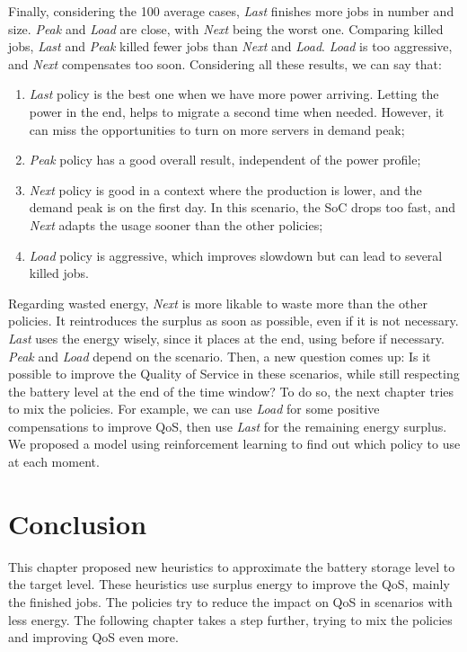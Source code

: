 Finally, considering the 100 average cases, \emph{Last} finishes more jobs in number and size. \emph{Peak} and \emph{Load} are close, with \emph{Next} being the worst one. Comparing killed jobs, \emph{Last} and \emph{Peak} killed fewer jobs than \emph{Next} and \emph{Load}. \emph{Load} is too aggressive, and \emph{Next} compensates too soon. Considering all these results, we can say that: 
\begin{enumerate}
    \item \emph{Last} policy is the best one when we have more power arriving. Letting the power in the end, helps to migrate a second time when needed. However, it can miss the opportunities to turn on more servers in demand peak;
    \item \emph{Peak} policy has a good overall result, independent of the power profile;
    \item \emph{Next} policy is good in a context where the production is lower, and the demand peak is on the first day. In this scenario, the SoC drops too fast, and \emph{Next} adapts the usage sooner than the other policies;
    \item \emph{Load} policy is aggressive, which improves slowdown but can lead to several killed jobs.
\end{enumerate}

Regarding wasted energy, \emph{Next} is more likable to waste more than the other policies. It reintroduces the surplus as soon as possible, even if it is not necessary. \emph{Last} uses the energy wisely, since it places at the end, using before if necessary. \emph{Peak} and \emph{Load} depend on the scenario. Then, a new question comes up: Is it possible to improve the Quality of Service in these scenarios, while still respecting the battery level at the end of the time window? To do so, the next chapter tries to mix the policies. For example, we can use \emph{Load} for some positive compensations to improve QoS, then use \emph{Last} for the remaining energy surplus. We proposed a model using reinforcement learning to find out which policy to use at each moment.

\section{Conclusion}
This chapter proposed new heuristics to approximate the battery storage level to the target level. These heuristics use surplus energy to improve the QoS, mainly the finished jobs. The policies try to reduce the impact on QoS in scenarios with less energy. The following chapter takes a step further, trying to mix the policies and improving QoS even more.